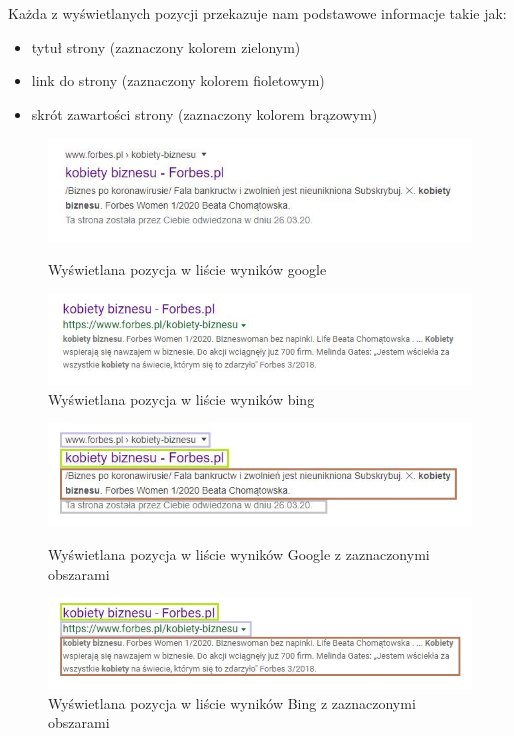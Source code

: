 \documentclass[licencjacka]{pracadypl}
\theoremstyle{definition}
\begin{document}
Każda z wyświetlanych pozycji przekazuje nam podstawowe informacje takie jak:
\begin{itemize}
	\item tytuł strony (zaznaczony kolorem zielonym)
	\item link do strony (zaznaczony kolorem fioletowym)
	\item skrót zawartości strony (zaznaczony kolorem brązowym)
\end{itemize}


\newpage

\begin{figure}[!htb]
	\includegraphics[width=\linewidth]{img/google-responseBody}
	\caption{Wyświetlana pozycja w liście wyników google} \label{google-responseBody}
	\endminipage\hfill 
	\includegraphics[width=\linewidth]{img/bing-responseBody}
	\caption{Wyświetlana pozycja w liście wyników bing} \label{bing-responseBody}
	\endminipage
\end{figure}

\begin{figure}[!htb]
	\includegraphics[width=\linewidth]{img/google-responseBodyPlus}
	\caption{Wyświetlana pozycja w liście wyników Google z zaznaczonymi obszarami} \label{google-responseBodyPlus}
	\endminipage\hfill 
	\includegraphics[width=\linewidth]{img/bing-responseBodyPlus}
	\caption{Wyświetlana pozycja w liście wyników Bing z zaznaczonymi obszarami} \label{bing-responseBodyPlus}
	\endminipage
\end{figure}
\end{document}
